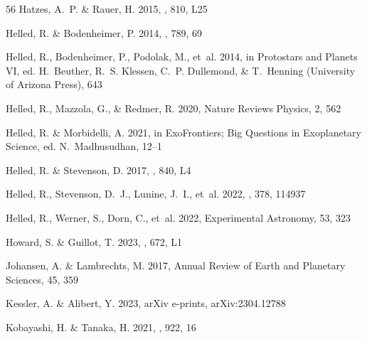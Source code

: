 \documentclass{aa}
\begin{document}
{\begin{thebibliography}{56}
{Hatzes}, A.~P. \& {Rauer}, H. 2015, \apjl, 810, L25

{Helled}, R. \& {Bodenheimer}, P. 2014, \apj, 789, 69

{Helled}, R., {Bodenheimer}, P., {Podolak}, M., {et~al.} 2014, in Protostars
  and Planets VI, ed. H.~{Beuther}, R.~S. {Klessen}, C.~P. {Dullemond}, \&
  T.~{Henning} (University of Arizona Press), 643

{Helled}, R., {Mazzola}, G., \& {Redmer}, R. 2020, Nature Reviews Physics, 2,
  562

{Helled}, R. \& {Morbidelli}, A. 2021, in ExoFrontiers; Big Questions in
  Exoplanetary Science, ed. N.~{Madhusudhan}, 12--1

{Helled}, R. \& {Stevenson}, D. 2017, \apjl, 840, L4

{Helled}, R., {Stevenson}, D.~J., {Lunine}, J.~I., {et~al.} 2022{},
  \icarus, 378, 114937

{Helled}, R., {Werner}, S., {Dorn}, C., {et~al.} 2022{},
  Experimental Astronomy, 53, 323

{Howard}, S. \& {Guillot}, T. 2023, \aap, 672, L1

{Johansen}, A. \& {Lambrechts}, M. 2017, Annual Review of Earth and Planetary
  Sciences, 45, 359

{Kessler}, A. \& {Alibert}, Y. 2023, arXiv e-prints, arXiv:2304.12788

{Kobayashi}, H. \& {Tanaka}, H. 2021, \apj, 922, 16


\end{thebibliography}}
\end{document}
